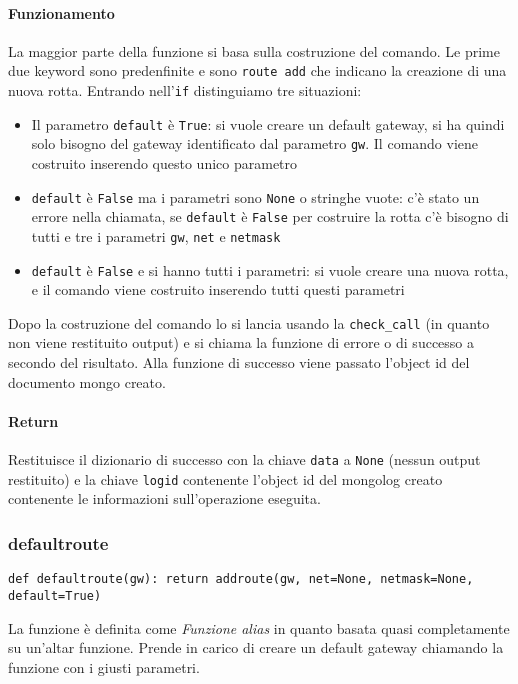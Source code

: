 \documentclass[11pt]{article}
\begin{document}
\paragraph{Funzionamento}
La maggior parte della funzione si basa sulla costruzione del comando. Le prime due keyword sono predenfinite
e sono \texttt{route add} che indicano la creazione di una nuova rotta. Entrando nell'\texttt{if} distinguiamo
tre situazioni:
\begin{itemize}
	\item{Il parametro \texttt{default} è \texttt{True}: si vuole creare un default gateway, si ha quindi solo
		bisogno del gateway identificato dal parametro \texttt{gw}. Il comando viene costruito inserendo
		questo unico parametro}
	\item{\texttt{default} è \texttt{False} ma i parametri sono \texttt{None} o stringhe vuote: c'è stato un
		errore nella chiamata, se \texttt{default} è \texttt{False} per costruire la rotta c'è bisogno
		di tutti e tre i parametri \texttt{gw}, \texttt{net} e \texttt{netmask}}
	\item{\texttt{default} è \texttt{False} e si hanno tutti i parametri: si vuole creare una nuova rotta,
		e il comando viene costruito inserendo tutti questi parametri}
\end{itemize}
Dopo la costruzione del comando lo si lancia usando la \texttt{check\_call} (in quanto non viene restituito
output) e si chiama la funzione di errore o di successo a secondo del risultato.
Alla funzione di successo viene passato l'object id del documento mongo creato.
\paragraph{Return}
Restituisce il dizionario di successo con la chiave \texttt{data} a \texttt{None} (nessun output restituito)
e la chiave \texttt{logid} contenente l'object id del mongolog creato contenente le informazioni
sull'operazione eseguita.

\subsubsection{defaultroute}\label{defaultroute}
\begin{lstlisting}
def defaultroute(gw): return addroute(gw, net=None, netmask=None, default=True) 
\end{lstlisting}
La funzione è definita come \textit{Funzione alias} in quanto basata quasi completamente su un'altar funzione.
Prende in carico di creare un default gateway chiamando la funzione  con i giusti parametri.
\end{document}
